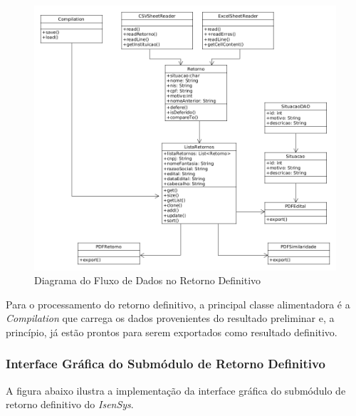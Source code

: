 \documentclass[
	12pt,			%
	openright,		%
	oneside,	
	a4paper,		%
	english,		%
	brazil			%
]{abntex2/abntex2}  %
\begin{document}
	\begin{figure}[H]
		\begin{center}
			
			\caption{Diagrama do Fluxo de Dados no Retorno Definitivo}
			\label{retorno-def-uml}
			
			\includegraphics[scale=0.5]{img/retorno-def-uml}
			
		\end{center}
	\end{figure}
	
	Para o processamento do retorno definitivo, a principal classe alimentadora é a \textit{Compilation} que carrega os dados provenientes do resultado preliminar e, a princípio, já estão prontos para serem exportados como resultado definitivo.
	
	\subsubsection{Interface Gráfica do Submódulo de Retorno Definitivo}
	
	A figura abaixo ilustra a implementação da interface gráfica do submódulo de retorno definitivo do \textit{IsenSys}.
	
\end{document}
